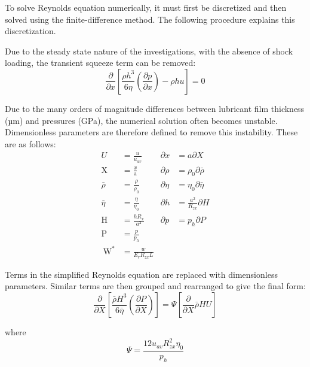 To solve Reynolds equation numerically, it must first be discretized and then solved using the finite-difference method. The following procedure explains this discretization.

Due to the steady state nature of the investigations, with the absence of shock loading, the transient squeeze term can be removed:
\begin{equation}\label{eq1.2}
	\frac{\partial}{\partial x}\left[\frac{\rho h^{3}}{6 \eta}\left(\frac{\partial p}{\partial x}\right)-\rho h u\right]=0
\end{equation}

Due to the many orders of magnitude differences between lubricant film thickness (µm) and pressures (GPa), the numerical solution often becomes unstable. Dimensionless parameters are therefore defined to remove this instability. These are as follows:
\begin{equation}\label{eq1.3}
	\begin{aligned}
		U &=\frac{u}{u_{a v}} & \partial x &=a \partial X \\
		\mathrm{X} &=\frac{x}{\mathrm{a}} & \partial \rho &=\rho_{0} \partial \bar{\rho} \\
		\bar{\rho} &=\frac{\rho}{\rho_{0}} & \partial \eta &=\eta_{0} \partial \bar{\eta} \\
		\bar{\eta} &=\frac{\eta}{\eta_{0}} & \partial h &=\frac{a^{2}}{R_{z x}} \partial H \\
		\mathrm{H} &=\frac{h R_{x}}{a^{2}} & \partial p &=p_{h} \partial P \\
		\mathrm{P} &=\frac{p}{p_{h}} & \\
		\mathrm{~W}^{*} &=\frac{w}{E_{r} R_{z x} L} &
	\end{aligned}
\end{equation}

Terms in the simplified Reynolds equation are replaced with dimensionless parameters. Similar terms are then grouped and rearranged to give the final form:
\begin{equation}\label{eq1.4}
	\frac{\partial}{\partial X}\left[\frac{\bar{\rho} H^{3}}{6 \bar{\eta}}\left(\frac{\partial P}{\partial X}\right)\right]=\Psi\left[\frac{\partial}{\partial X} \bar{\rho} H U\right]
\end{equation}

where
\begin{equation}\label{eq1.5}
	\Psi=\frac{12 u_{a v} R_{z x}^{2} \eta_{0}}{p_{h}}
\end{equation}

